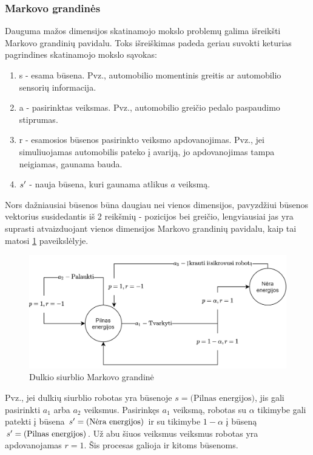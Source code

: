 \documentclass[a4paper, 12pt]{article}
\begin{document}
\subsubsection{Markovo grandinės}

Dauguma mažos dimensijos skatinamojo mokslo problemų galima išreikšti Markovo grandinių pavidalu. Toks išreiškimas padeda geriau suvokti keturias pagrindines skatinamojo mokslo sąvokas:

\begin{enumerate}
  \addtolength{\itemsep}{-0.5\baselineskip} 
  \item \gls{s} - esama būsena. Pvz., automobilio momentinis greitis ar automobilio sensorių informacija.
  \item \gls{a} - pasirinktas veiksmas. Pvz., automobilio greičio pedalo paspaudimo stiprumas.
  \item \gls{r} - esamosios būsenos pasirinkto veiksmo apdovanojimas. Pvz., jei simuliuojamas automobilis pateko į avariją, jo apdovanojimas tampa neigiamas, gaunama bauda.
  \item $s\sp{\prime}$ - nauja būsena, kuri gaunama atlikus $a$ veiksmą.
\end{enumerate}

Nors dažniausiai būsenos būna daugiau nei vienos dimensijos, pavyzdžiui būsenos vektorius susidedantis iš 2 reikšmių - pozicijos bei greičio, lengviausiai jas yra suprasti atvaizduojant vienos dimensijos Markovo grandinių pavidalu, kaip tai matosi \ref{DulkiuSiurblys} paveikslėlyje.

\begin{figure}[h]
\centering
\includegraphics[width=1\textwidth]{DulkiuSiurblys}
\caption{Dulkio siurblio Markovo grandinė}
\label{DulkiuSiurblys}
\end{figure}

Pvz., jei dulkių siurblio robotas yra būsenoje $s = \text{(Pilnas energijos)}$, jis gali pasirinkti $a_1$ arba $a_2$ veiksmus. Pasirinkęs $a_1$ veiksmą, robotas su $\alpha$ tikimybe gali patekti į būsena $s\sp{\prime} = \text{(Nėra energijos)}$ ir su tikimybe $1-\alpha$ į būseną $s\sp{\prime} = \text{(Pilnas energijos)}$. Už abu šiuos veiksmus veiksmus robotas yra apdovanojamas $r=1$. Šis procesas galioja ir kitoms būsenoms. 
\end{document}
